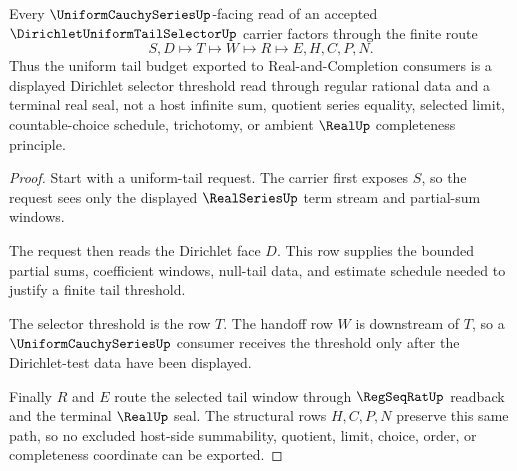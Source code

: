 \begin{theorem}
\label{thm:dirichlet-uniform-tail-selector-handoff}
Every $\UniformCauchySeriesUp$-facing read of an accepted $\DirichletUniformTailSelectorUp$ carrier factors through the finite route
$$
S,D \longmapsto T \longmapsto W \longmapsto R \longmapsto E,H,C,P,N .
$$
Thus the uniform tail budget exported to Real-and-Completion consumers is a displayed Dirichlet selector threshold read through regular rational data and a terminal real seal, not a host infinite sum, quotient series equality, selected limit, countable-choice schedule, trichotomy, or ambient $\RealUp$ completeness principle.
\end{theorem}
\begin{proof}
Start with a uniform-tail request. The carrier first exposes $S$, so the request sees only the displayed $\RealSeriesUp$ term stream and partial-sum windows.

The request then reads the Dirichlet face $D$. This row supplies the bounded partial sums, coefficient windows, null-tail data, and estimate schedule needed to justify a finite tail threshold.

The selector threshold is the row $T$. The handoff row $W$ is downstream of $T$, so a $\UniformCauchySeriesUp$ consumer receives the threshold only after the Dirichlet-test data have been displayed.

Finally $R$ and $E$ route the selected tail window through $\RegSeqRatUp$ readback and the terminal $\RealUp$ seal. The structural rows $H,C,P,N$ preserve this same path, so no excluded host-side summability, quotient, limit, choice, order, or completeness coordinate can be exported.
\end{proof}



